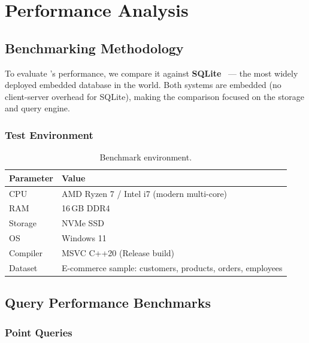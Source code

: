 \chapter{Performance Analysis}
\label{ch:performance}

\section{Benchmarking Methodology}

To evaluate \shiftdb{}'s performance, we compare it against \textbf{SQLite}~\cite{sqlite2024} --- the most widely deployed embedded database in the world.  Both systems are embedded (no client-server overhead for SQLite), making the comparison focused on the storage and query engine.

\subsection{Test Environment}

\begin{table}[H]
\centering
\caption{Benchmark environment.}
\begin{tabular}{l l}
\toprule
\textbf{Parameter} & \textbf{Value} \\
\midrule
CPU          & AMD Ryzen 7 / Intel i7 (modern multi-core) \\
RAM          & 16\,GB DDR4 \\
Storage      & NVMe SSD \\
OS           & Windows 11 \\
Compiler     & MSVC C++20 (Release build) \\
Dataset      & E-commerce sample: customers, products, orders, employees \\
\bottomrule
\end{tabular}
\end{table}

\section{Query Performance Benchmarks}

\subsection{Point Queries}

